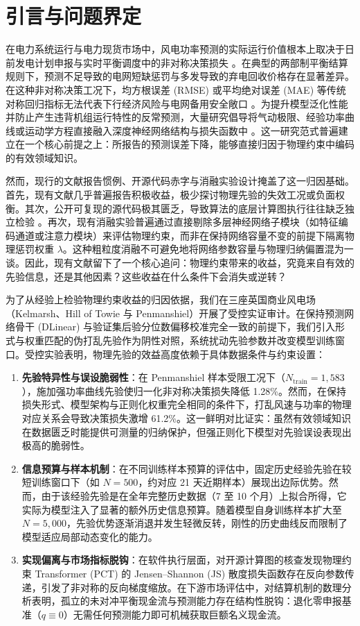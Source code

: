 \section{引言与问题界定}
\label{sec:intro}

在电力系统运行与电力现货市场中，风电功率预测的实际运行价值根本上取决于日前发电计划申报与实时平衡调度中的非对称决策损失 \cite{holttinen2021,weron2014}。在典型的两部制平衡结算规则下，预测不足导致的电网短缺惩罚与多发导致的弃电回收价格存在显著差异。在这种非对称决策工况下，均方根误差 (RMSE) 或平均绝对误差 (MAE) 等传统对称回归指标无法代表下行经济风险与电网备用安全敞口 \cite{lipton2019}。为提升模型泛化性能并防止产生违背机组运行特性的反常预测，大量研究倡导将气动极限、经验功率曲线或运动学方程直接融入深度神经网络结构与损失函数中 \cite{bastankhah2014new,karniadakis2021physics,raissi2019physics,s34_prx2023,pct2026}。这一研究范式普遍建立在一个核心前提之上：所报告的预测误差下降，能够直接归因于物理约束中编码的有效领域知识。

然而，现行的文献报告惯例、开源代码赤字与消融实验设计掩盖了这一归因基础。首先，现有文献几乎普遍报告积极收益，极少探讨物理先验的失效工况或负面权衡。其次，公开可复现的源代码极其匮乏，导致算法的底层计算图执行往往缺乏独立检验 \cite{kapoor2023,pineau2021}。再次，现有消融实验普遍通过直接剔除多层神经网络子模块（如特征编码通道或注意力模块）来评估物理约束，而非在保持网络容量不变的前提下隔离物理惩罚权重 $\lambda$。这种粗粒度消融不可避免地将网络参数容量与物理归纳偏置混为一谈。因此，现有文献留下了一个核心追问：物理约束带来的收益，究竟来自有效的先验信息，还是其他因素？这些收益在什么条件下会消失或逆转？

为了从经验上检验物理约束收益的归因依据，我们在三座英国商业风电场（Kelmarsh、Hill of Towie 与 Penmanshiel）开展了受控实证审计。在保持预测网络骨干 (DLinear) 与验证集后验分位数偏移校准完全一致的前提下，我们引入形式与权重匹配的伪打乱先验作为阴性对照，系统扰动先验参数并改变模型训练窗口。受控实验表明，物理先验的效益高度依赖于具体数据条件与约束设置：
\begin{enumerate}[leftmargin=*]
\item \textbf{先验特异性与误设脆弱性}：在 Penmanshiel 样本受限工况下（$N_{\text{train}}=1{,}583$），施加强功率曲线先验使归一化非对称决策损失降低 1.28\%。然而，在保持损失形式、模型架构与正则化权重完全相同的条件下，打乱风速与功率的物理对应关系会导致决策损失激增 61.2\%。这一鲜明对比证实：虽然有效领域知识在数据匮乏时能提供可测量的归纳保护，但强正则化下模型对先验误设表现出极高的脆弱性。
\item \textbf{信息预算与样本机制}：在不同训练样本预算的评估中，固定历史经验先验在较短训练窗口下（如 $N=500$，约对应 21 天近期样本）展现出边际优势。然而，由于该经验先验是在全年完整历史数据（7 至 10 个月）上拟合所得，它实际为模型注入了显著的额外历史信息预算。随着模型自身训练样本扩大至 $N=5{,}000$，先验优势逐渐消退并发生轻微反转，刚性的历史曲线反而限制了模型适应局部动态变化的能力。
\item \textbf{实现偏离与市场指标脱钩}：在软件执行层面，对开源计算图的核查发现物理约束 Transformer (PCT) 的 Jensen--Shannon (JS) 散度损失函数存在反向参数传递，引发了非对称的反向梯度缩放。在下游市场评估中，对结算机制的数理分析表明，孤立的未对冲平衡现金流与预测能力存在结构性脱钩：退化零申报基准（$q \equiv 0$）无需任何预测能力即可机械获取巨额名义现金流。
\end{enumerate}

